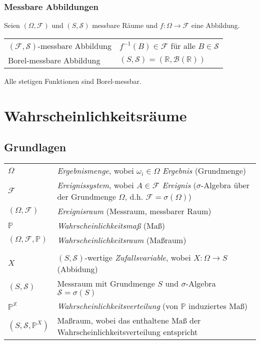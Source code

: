 \documentclass{article}
\begin{document}
\subsubsection*{Messbare Abbildungen}

Seien $(\Omega, \mathcal{F})$ und $(S, \mathcal{S})$ messbare Räume und $f: \Omega \to \mathcal{F}$ eine Abbildung.

\begin{tabular}{ll}
$(\mathcal{F},\mathcal{S})$-messbare Abbildung & $f^{-1}(B) \in \mathcal{F}$ für alle $B \in \mathcal{S}$ \\
Borel-messbare Abbildung & $(S,\mathcal{S}) = (\mathbb{R},\mathcal{B}(\mathbb{R}))$ \\
\end{tabular}

Alle stetigen Funktionen sind Borel-messbar.

\section{Wahrscheinlichkeitsräume}

\subsection{Grundlagen}

\begin{tabular}{ll}
$\Omega$ & \emph{Ergebnismenge}, wobei $\omega_i \in \Omega$ \emph{Ergebnis} (Grundmenge)\\
$\mathcal{F}$ & \emph{Ereignissystem}, wobei $A \in \mathcal{F}$ \emph{Ereignis} ($\sigma$-Algebra über der Grundmenge $\Omega$, d.h. $\mathcal{F} = \sigma(\Omega)$) \\
$(\Omega, \mathcal{F})$ & \emph{Ereignisraum} (Messraum, messbarer Raum) \\
$\mathbb{P}$ & \emph{Wahrscheinlichkeitsmaß} (Maß) \\
$(\Omega, \mathcal{F}, \mathbb{P})$ & \emph{Wahrscheinlichkeitsraum} (Maßraum) \\
& \\
$X$ & $(S,\mathcal{S})$-wertige \emph{Zufallsvariable}, wobei $X: \Omega \to S$ (Abbidung) \\
$(S,\mathcal{S})$ & Messraum mit Grundmenge $S$ und $\sigma$-Algebra $\mathcal{S} = \sigma(S)$\\
$\mathbb{P^X}$ & \emph{Wahrscheinlichkeitsverteilung} (von $\mathbb{P}$ induziertes Maß) \\
$(S,\mathcal{S},\mathbb{P}^X)$ & Maßraum, wobei das enthaltene Maß der Wahrscheinlichkeitsverteilung entspricht \\
\end{tabular}
\end{document}

